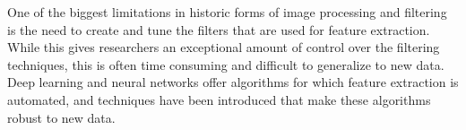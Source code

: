 One of the biggest limitations in historic forms of image processing and filtering is the need to create and tune the filters that are used for feature extraction. While this gives researchers an exceptional amount of control over the filtering techniques, this is often time consuming and difficult to generalize to new data. Deep learning and neural networks offer algorithms for which feature extraction is automated, and techniques have been introduced that make these algorithms robust to new data.





